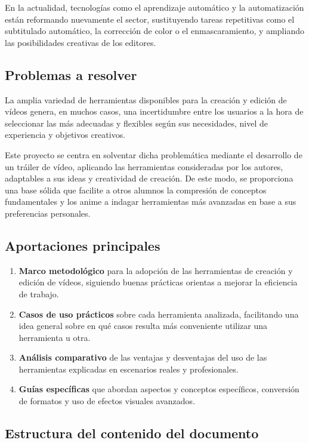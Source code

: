 En la actualidad, tecnologías como el aprendizaje automático y la automatización 
están reformando nuevamente el sector, sustituyendo tareas repetitivas como el 
subtitulado automático, la corrección de color o el enmascaramiento, y ampliando las 
posibilidades creativas de los editores.

\subsection{Problemas a resolver}

La amplia variedad de herramientas disponibles para la creación y edición de vídeos genera, 
en muchos casos, una incertidumbre entre los usuarios a la hora de seleccionar las más adecuadas 
y flexibles según sus necesidades, nivel de experiencia y objetivos creativos.

Este proyecto se centra en solventar dicha problemática mediante el desarrollo 
de un tráiler de vídeo, aplicando las herramientas consideradas por los autores, 
adaptables a sus ideas y creatividad de creación. De este modo, se proporciona una base sólida 
que facilite a otros alumnos la compresión de conceptos fundamentales y los anime 
a indagar herramientas más avanzadas en base a sus preferencias personales.

\subsection{Aportaciones principales}

\begin{enumerate}[label=\arabic*.]
    \item \textbf{Marco metodológico} para la adopción de las herramientas de creación y 
    edición de vídeos, siguiendo buenas prácticas orientas a mejorar la eficiencia de trabajo.
    \item \textbf{Casos de uso prácticos} sobre cada herramienta analizada, 
    facilitando una idea general sobre en qué casos resulta más conveniente 
    utilizar una herramienta u otra.
    \item \textbf{Análisis comparativo} de las ventajas y desventajas del uso de las 
    herramientas explicadas en escenarios reales y profesionales.
    \item \textbf{Guías específicas} que abordan aspectos y conceptos específicos, 
    conversión de formatos y uso de efectos visuales avanzados.
\end{enumerate}


\subsection{Estructura del contenido del documento}

